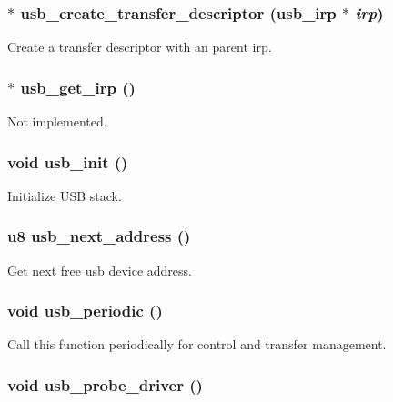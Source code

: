 \subsubsection{$\ast$ usb\_\-create\_\-transfer\_\-descriptor ({\bf usb\_\-irp} $\ast$ {\em irp})}\label{core_8h_7e0bd9c92c1fb753304e6f77c0d6bd2c}


Create a transfer descriptor with an parent irp. 
\subsubsection{$\ast$ usb\_\-get\_\-irp ()}\label{core_8h_b4a317acc71220967da6cf6dd1da7ac9}


Not implemented. 
\subsubsection{\setlength{\rightskip}{0pt plus 5cm}void usb\_\-init ()}\label{core_8h_60af0d8621d025f018ba0f56bca00a93}


Initialize USB stack. 
\subsubsection{\setlength{\rightskip}{0pt plus 5cm}u8 usb\_\-next\_\-address ()}\label{core_8h_c58f28f1c2693257b89945e785403baf}


Get next free usb device address. 
\subsubsection{\setlength{\rightskip}{0pt plus 5cm}void usb\_\-periodic ()}\label{core_8h_56f96c6ef2028c55dce92873a489419d}


Call this function periodically for control and transfer management. 
\subsubsection{\setlength{\rightskip}{0pt plus 5cm}void usb\_\-probe\_\-driver ()}\label{core_8h_99cd77f8e4ac64be0d886f31148acb09}



